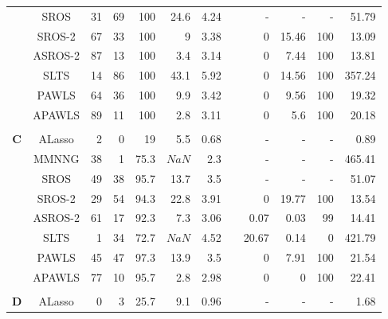 \documentclass{article}\usepackage[]{graphicx}\usepackage[]{color}
\begin{document}
\begin{table}[thp]
\begin{center}
\begin{tabular}{ccrrrrrrrrrr}
	      & SROS & 31 & 69 & 100 
	      & 24.6 & 4.24 & & -& - & - &  51.79\\
	      
	       & SROS-2 & 67 & 33 & 100 
	      & 9 & 3.38 & & 0 
	      & 15.46 & 100 & 13.09\\
	      
	      & ASROS-2 & 87 & 13 & 100 
	      & 3.4 & 3.14 & & 0 
	      & 7.44 & 100 & 13.81\\
	      
	      
	       & SLTS & 14 & 86 & 100 
	      & 43.1 & 5.92 & & 0 
	      & 14.56 & 100 & 357.24\\
	      
	      & PAWLS & 64 & 36 & 100 
	      & 9.9 & 3.42 & & 0 
	      & 9.56 & 100 & 19.32\\
	      
	      & APAWLS & 89 & 11 & 100 
	      & 2.8 & 3.11 & & 0 
	      & 5.6 & 100 & 20.18\\
	      \\
	        	  \multirow{8}{*}{{\bf C}}
	       & ALasso & 2 & 0 & 19 
	      & 5.5 & 0.68 & & -& - & - &  0.89\\
	      
	      & MMNNG & 38 & 1 & 75.3 
	      & \ensuremath{NaN} & 2.3 & & -& - & - & 465.41\\
	      
	      & SROS & 49 & 38 & 95.7 
	      & 13.7 & 3.5 & & -& - & - &  51.07\\
	      
	       & SROS-2 & 29 & 54 & 94.3 
	      & 22.8 & 3.91 & & 0 
	      & 19.77 & 100 & 13.54\\
	      
	      & ASROS-2 & 61 & 17 & 92.3 
	      & 7.3 & 3.06 & & 0.07 
	      & 0.03 & 99 & 14.41\\
	      
	      
	       & SLTS & 1 & 34 & 72.7 
	      & \ensuremath{NaN} & 4.52 & & 20.67 
	      & 0.14 & 0 & 421.79\\
	      
	      & PAWLS & 45 & 47 & 97.3 
	      & 13.9 & 3.5 & & 0 
	      & 7.91 & 100 & 21.54\\
	      
	      & APAWLS & 77 & 10 & 95.7 
	      & 2.8 & 2.98 & & 0 
	      & 0 & 100 & 22.41\\
	      
	     \\
	       	  \multirow{8}{*}{{\bf D}}
	      & ALasso & 0 & 3 & 25.7 
	      & 9.1 & 0.96 & & -& - & - &  1.68\\
	      

\end{tabular}
\end{center}
\end{table}
\end{document}
